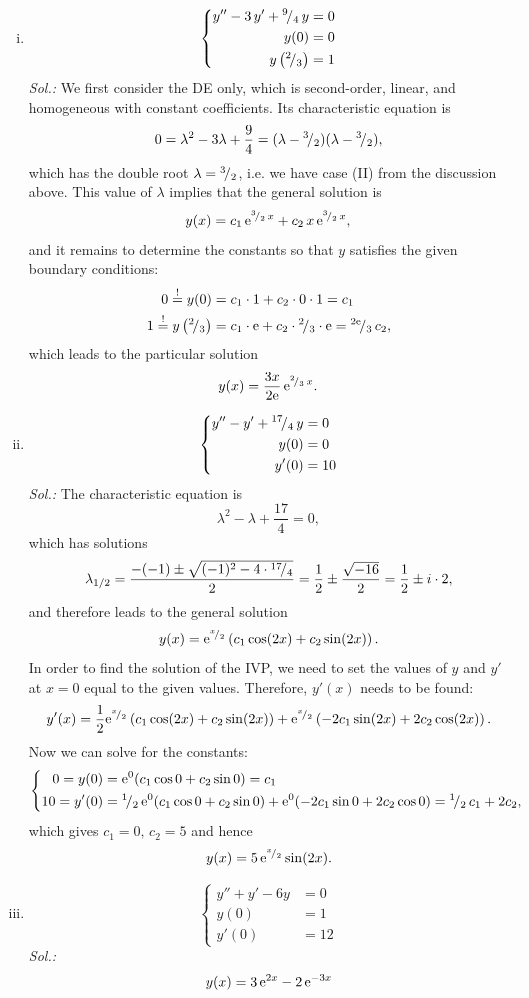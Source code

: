 \begin{example}
\label{expl:bvps_ivps}
\begin{enumerate}[(i)]
	\item
	\[ \left\{ 
	\begin{split}
		y''-3\,y'+{}^{9}\!/_{4}\,y & = 0 \\ 
		y(0) & = 0 \\ y\left({}^{2}\!/_{3}\right) & = 1
	\end{split}
	\right.\]
	{\it Sol.:} We first consider the DE only, which is second-order, linear, and homogeneous with constant coefficients. Its characteristic equation is
	\[ 0 = \lambda^2-3\lambda+\frac94 = (\lambda-{}^{3}\!/_{2})(\lambda-{}^{3}\!/_{2}), \]
	which has the double root $\lambda={}^{3}\!/_{2}$, i.e. we have case (II) from the discussion above. This value of $\lambda$ implies that the general solution is
	\[ y(x) = c_1\,\mathrm{e}^{{}^{3}\!/_{2}\,x} + c_2\,x\,\mathrm{e}^{{}^{3}\!/_{2}\,x}, \]
	and it remains to determine the constants so that $y$ satisfies the given boundary conditions:
	\[ \begin{split}
	0 \stackrel{!}{=} y(0) & = c_1\cdot1 +c_2\cdot0\cdot1 = c_1 \\
	1 \stackrel{!}{=} y\left( {}^{2}\!/_{3} \right) 
		& = c_1 \cdot \mathrm{e} + c_2 \cdot {}^{2}\!/_{3} \cdot \mathrm{e} = {}^{2\mathrm{e}}\!/_{3}\,c_2,
	\end{split}\]
	which leads to the particular solution 
	\[ y(x) = \frac{3x}{2\mathrm{e}}\,\mathrm{e}^{{}^{2}\!/_{3}\,x}. \]
	\item
		\[ \left\{ 
	\begin{split}
			y''-y'+{}^{17}\!/_{4}\,y & = 0 \\ 
			y(0) & = 0 \\ y'(0) & = 10
	\end{split}
	\right.\]
	{\it Sol.:} 
	The characteristic equation is 
	\[ \lambda^2-\lambda +\frac{17}{4} = 0, \]
	which has solutions
	\[ \lambda_{1/2} = \frac{-(-1)\pm\sqrt{(-1)^2-4 \cdot {}^{17}\!/_{4}}}{2}
	= \frac12 \pm \frac{\sqrt{-16}}{2} = \frac12 \pm i \cdot 2, \]
	and therefore leads to the general solution
	\[ y(x) = \mathrm{e}^{{}^{x}\!/_{2}}\left( c_1\cos(2x) + c_2\sin(2x) \right). \]
	In order to find the solution of the IVP, we need to set the values of $y$ and $y'$ at $x=0$ equal to the given values. Therefore, $y'(x)$ needs to be found:
	\[ y'(x) = \frac12\mathrm{e}^{{}^{x}\!/_{2}}\left( c_1\cos(2x) + c_2\sin(2x) \right)
	+\mathrm{e}^{{}^{x}\!/_{2}}\left(-2c_1\sin(2x) + 2c_2\cos(2x) \right).\]
	Now we can solve for the constants:
	\[ \left\{ \begin{split}
	0=y(0)&=\mathrm{e}^0 (c_1\cos 0 + c_2\sin 0) = c_1 \\
	10=y'(0)&={}^{1}\!/_{2}\,\mathrm{e}^0(c_1\cos 0 + c_2\sin 0)
	+ \mathrm{e}^0 (-2c_1\sin 0 + 2c_2\cos 0)={}^{1}\!/_{2}\,c_1+2c_2,
	\end{split}\right.\]
	which gives $c_1=0,\,c_2=5$ and hence
	\[ y(x) = 5\,\mathrm{e}^{{}^{x}\!/_{2}}\sin(2x). \]
	\item
	\[\left\{ \begin{split}
	y''+y'-6y &= 0 \\ y(0) &= 1 \\ y'(0) &= 12
	 \end{split}\right.\]
	{\it Sol.:} 
	\[ y(x) = 3\,\mathrm{e}^{2x}-2\,\mathrm{e}^{-3x}\]
\end{enumerate}
\end{example}

